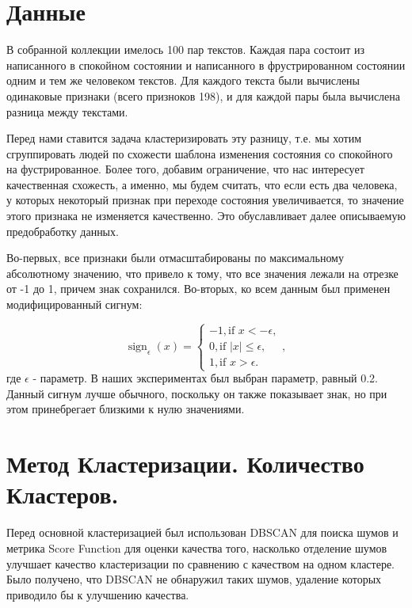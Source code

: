 \documentclass[12pt]{article}
\DeclareMathOperator{\sign}{sign}
\begin{document}
\section{Данные}

В собранной коллекции имелось 100 пар текстов. Каждая пара состоит из написанного в спокойном состоянии и написанного в фрустрированном состоянии одним и тем же человеком текстов. Для каждого текста были вычислены одинаковые признаки (всего призноков 198), и для каждой пары была вычислена разница между текстами.

Перед нами ставится задача кластеризировать эту разницу, т.е. мы хотим сгруппировать людей по схожести шаблона изменения состояния со спокойного на фустрированное. Более того, добавим ограничение, что нас интересует качественная схожесть, а именно, мы будем считать, что если есть два человека, у которых некоторый признак при переходе состояния увеличивается, то значение этого признака не изменяется качественно. Это обуславливает далее описываемую предобработку данных.

Во-первых, все признаки были отмасштабированы по максимальному абсолютному значению, что привело к тому, что все значения лежали на отрезке от -1 до 1, причем знак сохранился. Во-вторых, ко всем данным был применен модифицированный сигнум:

\begin{equation*}
\sign_\epsilon(x) = 
 \begin{cases}
   -1, \text{if } x < -\epsilon,\\
   0, \text{if } |x| \leq \epsilon,\\
   1, \text{if } x > \epsilon.
 \end{cases}
 ,
\end{equation*}
где $\epsilon$ - параметр. В наших экспериментах был выбран параметр, равный 0.2. Данный сигнум лучше обычного, поскольку он также показывает знак, но при этом принебрегает близкими к нулю значениями.

\section{Метод Кластеризации. Количество Кластеров.}

Перед основной кластеризацией был использован DBSCAN для поиска шумов и метрика Score Function для оценки качества того, насколько отделение шумов улучшает качество кластеризации по сравнению с качеством на одном кластере. Было получено, что DBSCAN не обнаружил таких шумов, удаление которых приводило бы к улучшению качества.
\end{document}
